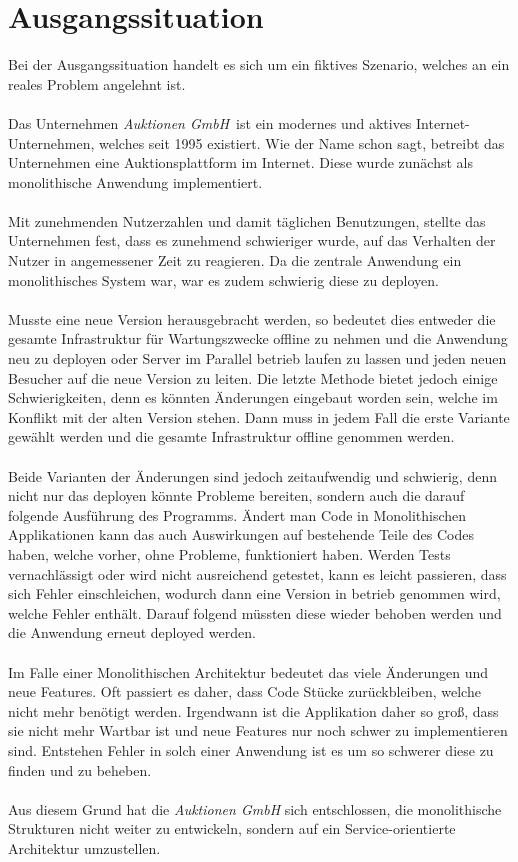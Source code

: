 \section{Ausgangssituation}
\label{sec:ausgangssituation}
Bei der Ausgangssituation handelt es sich um ein fiktives Szenario, welches an ein reales Problem
angelehnt ist.
\\\\
Das Unternehmen \textit{Auktionen GmbH}\ ist ein modernes und aktives Internet-Unternehmen, welches seit 1995 existiert. Wie der Name schon sagt, betreibt das Unternehmen eine Auktionsplattform im Internet. Diese wurde zunächst als monolithische Anwendung implementiert.
\\\\
Mit zunehmenden Nutzerzahlen und damit täglichen Benutzungen, stellte das Unternehmen fest, dass es zunehmend schwieriger wurde, auf das Verhalten der Nutzer in angemessener Zeit zu reagieren. Da die zentrale Anwendung ein monolithisches System war, war es zudem schwierig diese zu deployen.
\\\\
Musste eine neue Version herausgebracht werden, so bedeutet dies entweder die gesamte Infrastruktur für Wartungszwecke offline zu nehmen und die Anwendung neu zu deployen oder Server im Parallel betrieb laufen zu lassen und jeden neuen Besucher auf die neue Version zu leiten. Die letzte Methode bietet jedoch einige Schwierigkeiten, denn es könnten Änderungen eingebaut worden sein, welche im Konflikt mit der alten Version stehen. Dann muss in jedem Fall die erste Variante gewählt werden und die gesamte Infrastruktur offline genommen werden.
\\\\
Beide Varianten der Änderungen sind jedoch zeitaufwendig und schwierig, denn nicht nur das deployen könnte Probleme bereiten, sondern auch die darauf folgende Ausführung des Programms. Ändert man Code in Monolithischen Applikationen kann das auch Auswirkungen auf bestehende Teile des Codes haben, welche vorher, ohne Probleme, funktioniert haben. Werden Tests vernachlässigt oder wird nicht ausreichend getestet, kann es leicht passieren, dass sich Fehler einschleichen, wodurch dann eine Version in betrieb genommen wird, welche Fehler enthält. Darauf folgend müssten diese wieder behoben werden und die Anwendung erneut deployed werden.
\\\\
Im Falle einer Monolithischen Architektur bedeutet das viele Änderungen und neue Features. Oft passiert es daher, dass Code Stücke zurückbleiben, welche nicht mehr benötigt werden. Irgendwann ist die Applikation daher so groß, dass sie nicht mehr Wartbar ist und neue Features nur noch schwer zu implementieren sind. Entstehen Fehler in solch einer Anwendung ist es um so schwerer diese zu finden und zu beheben.
\\\\
Aus diesem Grund hat die \textit{Auktionen GmbH} sich entschlossen, die monolithische Strukturen nicht weiter zu entwickeln, sondern auf ein Service-orientierte Architektur umzustellen.

